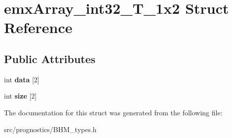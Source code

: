 \hypertarget{structemxArray__int32__T__1x2}{}\section{emx\+Array\+\_\+int32\+\_\+\+T\+\_\+1x2 Struct Reference}
\label{structemxArray__int32__T__1x2}
\subsection*{Public Attributes}
\begin{DoxyCompactItemize}
\item 
\mbox{\label{structemxArray__int32__T__1x2_a59038fd8137a09bcce13054d5608a5bb}} 
int {\bfseries data} \mbox{[}2\mbox{]}
\item 
\mbox{\label{structemxArray__int32__T__1x2_ad7ecd09ba7894911aa76dd90437b10b3}} 
int {\bfseries size} \mbox{[}2\mbox{]}
\end{DoxyCompactItemize}


The documentation for this struct was generated from the following file\+:\begin{DoxyCompactItemize}
\item 
src/prognostics/B\+H\+M\+\_\+types.\+h\end{DoxyCompactItemize}

